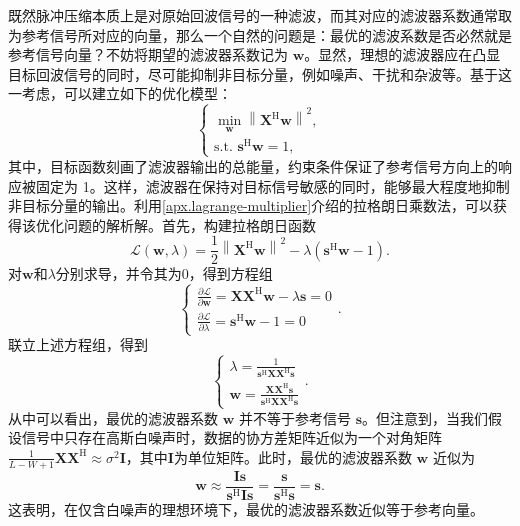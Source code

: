 既然脉冲压缩本质上是对原始回波信号的一种滤波，而其对应的滤波器系数通常取为参考信号所对应的向量，那么一个自然的问题是：最优的滤波系数是否必然就是参考信号向量？不妨将期望的滤波器系数记为 \( \bm{w} \)。显然，理想的滤波器应在凸显目标回波信号的同时，尽可能抑制非目标分量，例如噪声、干扰和杂波等。基于这一考虑，可以建立如下的优化模型：
\[
    \begin{cases}
        \min\limits_{\bm{w}} \left\| \mathbf{X}^{\mathrm{H}} \bm{w} \right\|^2, \\[6pt]
        \text{s.t. } \bm{s}^{\mathrm{H}} \bm{w} = 1 ,
    \end{cases}
\]
其中，目标函数刻画了滤波器输出的总能量，约束条件保证了参考信号方向上的响应被固定为 1。这样，滤波器在保持对目标信号敏感的同时，能够最大程度地抑制非目标分量的输出。利用\cref{apx.lagrange-multiplier}介绍的拉格朗日乘数法，可以获得该优化问题的解析解。首先，构建拉格朗日函数
\[
    \mathcal{L}(\bm{w}, \lambda) = \frac{1}{2}\left\| \mathbf{X}^{\mathrm{H}} \bm{w} \right\|^2 - \lambda \left( \bm{s}^{\mathrm{H}} \bm{w} - 1 \right).
\]
对\( \bm{w} \)和\( \lambda \)分别求导，并令其为0，得到方程组
\[
    \begin{cases}
        \frac{\partial \mathcal{L}}{\partial \bm{w}} = \mathbf{X} \mathbf{X}^{\mathrm{H}} \bm{w} - \lambda \bm{s} = 0 \\
        \frac{\partial \mathcal{L}}{\partial \lambda} = \bm{s}^{\mathrm{H}} \bm{w} - 1 = 0
    \end{cases}.
\]
联立上述方程组，得到
\[
    \begin{cases}
        \lambda = \frac{1}{\bm{s}^{\mathrm{H}} \mathbf{X} \mathbf{X}^{\mathrm{H}} \bm{s}} \\
        \bm{w} = \frac{\mathbf{X} \mathbf{X}^{\mathrm{H}} \bm{s}}{\bm{s}^{\mathrm{H}} \mathbf{X} \mathbf{X}^{\mathrm{H}} \bm{s}}
    \end{cases}.
\]
从中可以看出，最优的滤波器系数 \( \bm{w} \) 并不等于参考信号 \( \bm{s} \)。但注意到，当我们假设信号中只存在高斯白噪声时，数据的协方差矩阵近似为一个对角矩阵\( \frac{1}{L-W+1} \mathbf{X} \mathbf{X}^{\mathrm{H}} \approx \sigma^2 \mathbf{I} \)，其中\( \mathbf{I} \)为单位矩阵。此时，最优的滤波器系数 \( \bm{w} \) 近似为
\[
    \bm{w} \approx \frac{ \mathbf{I} \bm{s}}{\bm{s}^{\mathrm{H}} \mathbf{I} \bm{s}} = \frac{\bm{s}}{\bm{s}^{\mathrm{H}} \bm{s}} = \bm{s}.
\]
这表明，在仅含白噪声的理想环境下，最优的滤波器系数近似等于参考向量。


